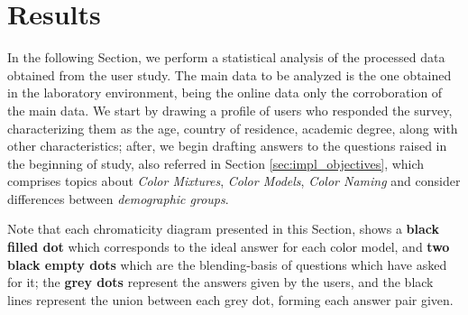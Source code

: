 \section{Results}
\label{sec:results_results}
%
In the following Section, we perform a statistical analysis of the processed data obtained from the user study. The main data to be analyzed is the one obtained in the
laboratory environment, being the online data only the corroboration of the main data. We start by drawing a profile of users who responded the survey, characterizing them as the age,
country of residence, academic degree, along with other characteristics; after, we begin drafting answers to the questions raised in the beginning of study, also referred in Section
\ref{sec:impl_objectives}, which comprises topics about \emph{Color Mixtures}, \emph{Color Models}, \emph{Color Naming} and consider differences between \emph{demographic groups}. \par
%
Note that each chromaticity diagram presented in this Section, shows a \textbf{black filled dot} which corresponds to the ideal answer for each color model, and \textbf{two black empty dots} which are the
blending-basis of questions which have asked for it; the \textbf{grey dots} represent the answers given by the users, and the black lines represent the union between each grey dot, forming each
answer pair given. \par
%
